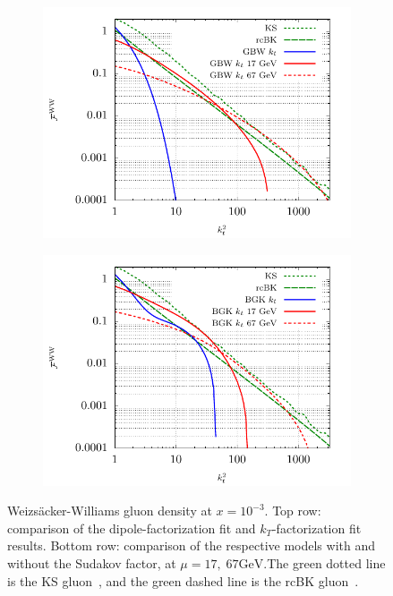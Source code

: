 \documentclass[11pt]{article}
\begin{document}
\begin{figure}[t]
\begin{subfigure}{0.5\textwidth}
        \includegraphics[width=\textwidth]{plots/GBWWW2} 
    \end{subfigure}
    \begin{subfigure}{0.5\textwidth}
        \includegraphics[width=\textwidth]{plots/BGKWW2} 
    \end{subfigure}
    \caption{ Weizs\"acker-Williams gluon density at $x=10^{-3}$. Top row: comparison of the dipole-factorization fit and $k_T$-factorization fit results. Bottom row: comparison of the respective models with and without the Sudakov factor, at $\mu=17,\;67 \mathrm{GeV}$.The green dotted line is the KS gluon~\cite{vanHameren:2021sqc}, and the green dashed line is the rcBK gluon~\cite{Albacete:2010sy}. }
    \label{fig:ww}
\end{figure}
\end{document}
